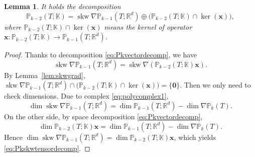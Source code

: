 \documentclass[10pt]{amsart}
\newtheorem{lemma}[theorem]{Lemma}
\newcommand{\skw}{\operatorname{skw}}
\numberwithin{equation}{section}
\begin{document}
\begin{lemma}
It holds the decomposition
\begin{equation}\label{eq:Pkskwtensordecomp}  
\mathbb P_{k-2}(T;\mathbb K)=\skw\nabla\mathbb P_{k-1}(T;\mathbb R^d)\oplus\big(\mathbb P_{k-2}(T;\mathbb K)\cap\ker(\boldsymbol{x})\big),
\end{equation}
where $\mathbb P_{k-2}(T;\mathbb K)\cap\ker(\boldsymbol{x})$ means the kernel of operator $\boldsymbol{x}: \mathbb P_{k-2}(T;\mathbb K)\to\mathbb P_{k-1}(T;\mathbb R^d)$.
\end{lemma}
\begin{proof}
Thanks to decomposition \eqref{eq:Pkvectordecomp}, we have 
\[
\skw\nabla\mathbb P_{k-1}(T;\mathbb R^d)=\skw\nabla(\mathbb P_{k-2}(T;\mathbb K)\boldsymbol{x}).
\]
By Lemma~\ref{lem:skwgrad}, $\skw\nabla\mathbb P_{k-1}(T;\mathbb R^d)\cap\big(\mathbb P_{k-2}(T;\mathbb K)\cap\ker(\boldsymbol{x})\big)=\{\boldsymbol{0}\}$. Then we only need to check dimensions.
Due to complex \eqref{eq:polycomplex1},
\begin{equation}\label{eq:20220324-1}  
\dim\skw\nabla\mathbb P_{k-1}(T;\mathbb R^d)=\dim\mathbb P_{k-1}(T;\mathbb R^d)-\dim\nabla\mathbb P_k(T).
\end{equation}
On the other side, by space decomposition \eqref{eq:Pkvectordecomp},
\[
\dim\mathbb P_{k-2}(T;\mathbb K)\boldsymbol{x}=\dim\mathbb P_{k-1}(T;\mathbb R^{d})-\dim\nabla\mathbb P_k(T).
\]
Hence $\dim\skw\nabla\mathbb P_{k-1}(T;\mathbb R^d)=\dim\mathbb P_{k-2}(T;\mathbb K)\boldsymbol{x}$, which yields \eqref{eq:Pkskwtensordecomp}.
\end{proof}

\end{document}
